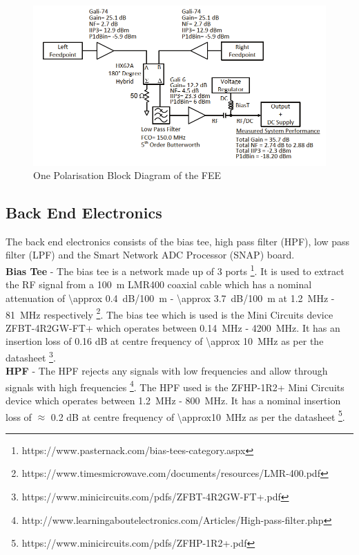 \documentclass{ws-jai}
\begin{document}
\begin{figure}[h]
	\begin{center}
		\includegraphics[width=0.7\linewidth]{Figures/Balun_Block.png}
		\caption{One Polarisation Block Diagram of the FEE \cite{2012PASP..124.1090H}}
		\label{Fig:Balun Schematic}
	\end{center}
\end{figure}

\subsection{Back End Electronics}	
The back end electronics consists of the bias tee, high pass filter (HPF), low pass filter (LPF) and the Smart Network ADC Processor (SNAP) board. \\

\textbf{Bias Tee} - The bias tee is a network made up of 3 ports \footnote{https://www.pasternack.com/bias-tees-category.aspx}. It is used to extract the RF signal from a \SI{100}{m} LMR400 coaxial cable which has a nominal attenuation of \SI{\approx 0.4}{dB/\SI{100}{m}} - \SI{\approx 3.7}{dB/\SI{100}{m}} at \SI{1.2}{MHz} - \SI{81}{MHz} respectively \footnote{https://www.timesmicrowave.com/documents/resources/LMR-400.pdf}. The bias tee which is used is the Mini Circuits device ZFBT-4R2GW-FT+ which operates between \SI{0.14}{MHz} - \SI{4200}{MHz}. It has an insertion loss of 0.16 dB at centre frequency of  \SI{\approx 10}{MHz} as per the datasheet \footnote{https://www.minicircuits.com/pdfs/ZFBT-4R2GW-FT+.pdf}.\\

\textbf{HPF} - The HPF rejects any signals with low frequencies and allow through signals with high frequencies \footnote{http://www.learningaboutelectronics.com/Articles/High-pass-filter.php}. The HPF used is the ZFHP-1R2+ Mini Circuits device which operates between  \SI{1.2}{MHz} - \SI{800}{MHz}. It has a nominal insertion loss of $\approx$ 0.2 dB at centre frequency of  \SI{\approx10}{MHz} as per the datasheet \footnote{https://www.minicircuits.com/pdfs/ZFHP-1R2+.pdf}.\\
\end{document}
